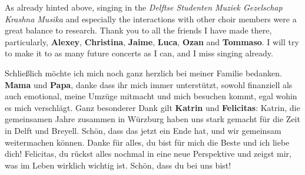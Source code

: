 As already hinted above, singing in the \textit{Delftse Studenten Muziek Gezelschap Krashna Musika} and especially the interactions with other choir members were a great balance to research.
%
Thank you to all the friends I have made there, particularly, \textbf{Alexey}, \textbf{Christina}, \textbf{Jaime}, \textbf{Luca}, \textbf{Ozan} and \textbf{Tommaso}.
%
I will try to make it to as many future concerts as I can, and I miss singing already.

{
Schließlich möchte ich mich noch ganz herzlich bei meiner Familie bedanken.
%
\textbf{Mama} und \textbf{Papa}, danke dass ihr mich immer unterstützt, sowohl finanziell als auch emotional, meine Umzüge mitmacht und mich besuchen kommt, egal wohin es mich verschlägt.
%
Ganz besonderer Dank gilt \textbf{Katrin} und \textbf{Felicitas}:
%
Katrin, die gemeinsamen Jahre zusammen in Würzburg haben uns stark gemacht für die Zeit in Delft und Breyell.
%
Schön, dass das jetzt ein Ende hat, und wir gemeinsam weitermachen können.
%
Danke für alles, du bist für mich die Beste und ich liebe dich!
%
Felicitas, du rückst alles nochmal in eine neue Perspektive und zeigst mir, was im Leben wirklich wichtig ist.
%
Schön, dass du bei uns bist!
}